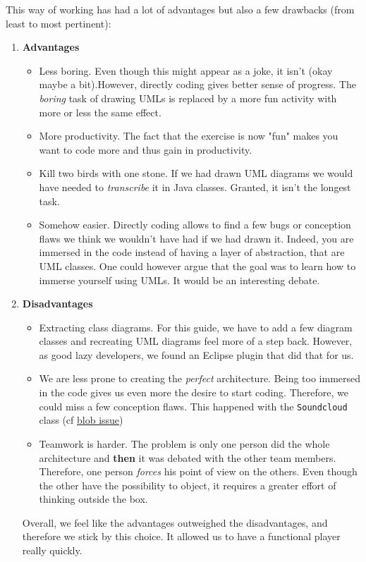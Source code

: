 \documentclass{report}
\begin{document}
{This way of working has had a lot of advantages but also a few drawbacks (from least to most pertinent): 
\begin{enumerate}
\item \textbf{Advantages}
\begin{itemize}
\item Less boring. Even though this might appear as a joke, it isn't \tiny{(okay maybe a bit)}.\normalsize  However, directly coding gives better sense of progress. The \textit{boring} task of drawing UMLs is replaced by a more fun activity with more or less the same effect. 
\item More productivity. The fact that the exercise is now "fun" makes you want to code more and thus gain in productivity.
\item Kill two birds with one stone. If we had drawn UML diagrams we would have needed to \textit{transcribe} it in Java classes. Granted, it isn't the longest task.
\item Somehow easier. Directly coding allows to find a few bugs or conception flaws we think we wouldn't have had if we had drawn it. Indeed, you are immersed in the code instead of having a layer of abstraction, that are UML classes. One could however argue that the goal was to learn how to immerse yourself using UMLs. It would be an interesting debate.
\end{itemize}
\item \textbf{Disadvantages}
\begin{itemize}
\item Extracting class diagrams. For this guide, we have to add a few diagram classes and recreating UML diagrams feel more of a step back. However, as good lazy developers, we found an Eclipse plugin that did that for us.
\item We are less prone to creating the \textit{perfect} architecture. Being too immersed in the code gives us even more the desire to start coding. Therefore, we could miss a few conception flaws. This happened with the \texttt{Soundcloud} class (cf \hyperlink{blob}{blob issue})
\item Teamwork is harder. The problem is only one person did the whole architecture and \textbf{then} it was debated with the other team members. Therefore, one person \textit{forces} his point of view on the others. Even though the other have the possibility to object, it requires a greater effort of thinking outside the box.
\end{itemize}

Overall, we feel like the advantages outweighed the disadvantages, and therefore we stick by this choice. It allowed us to have a functional player really quickly.


\end{enumerate}}
\end{document}
